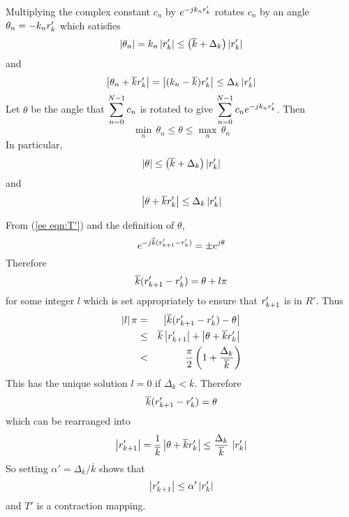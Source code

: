 Multiplying the complex constant $c_n$ by ${e^{-jk_n{r}'_k}}$ rotates $c_n$ by
an angle $\theta_n=-k_n{r}'_k$ which satisfies
\begin{equation}
\left|\theta_n\right|=
k_n\left|{r}'_k\right|\leq\left(\overline{k}+\Delta_k\right)\left|{r}'_k\right|
\end{equation}
and 
\begin{equation}
\left|\theta_n+\overline{k}{r}'_k\right|
=\left|(k_n-\overline{k}){r}'_k\right|\leq\Delta_k\left|{r}'_k\right|
\end{equation}
Let $\theta$ be the angle that $\displaystyle\sum_{n=0}^{N-1}c_n$ is rotated to give
$\displaystyle\sum_{n=0}^{N-1}c_n{e^{-jk_n{r}'_k}}$.  Then
\begin{equation}
\min_n\, \theta_n\leq \theta\leq\max_n\,\theta_n
\end{equation}
In particular,
\begin{equation}
\left|\theta\right|\leq\left(\overline{k}+\Delta_k\right)\left|{r}'_k\right|
\end{equation}
and 
\begin{equation}
\left|\theta+\overline{k}{r}'_k\right|\leq\Delta_k\left|{r}'_k\right|
\end{equation}

From (\ref{ee eqn:T'}) and the definition of $\theta$,
\begin{equation}
{e^{-j\overline{k}({r}'_{k+1}-{r}'_k)}}=\pm{e^{j\theta}}
\end{equation}
Therefore
\begin{equation}
\overline{k}({r}'_{k+1}-{r}'_k)=\theta+l\pi
\end{equation}
for some integer $l$ which is set appropriately to ensure that ${r}'_{k+1}$
is in $R'$.  Thus
\begin{eqnarray}
\left|l\right|\pi
&=&\left|\overline{k}({r}'_{k+1}-{r}'_k)-\theta\right| {\nonumber}\\
&\leq&\overline{k}\left|{r}'_{k+1}\right|+\left|\theta+\overline{k}{r}'_k\right|{\nonumber}\\
&<&\frac{\pi}{2}\left(1+\frac{\Delta_k}{\overline{k}}\right)
\end{eqnarray}
This has the unique solution $l=0$ if $\Delta_k<\overline{k}$.  Therefore
\begin{equation}
\overline{k}({r}'_{k+1}-{r}'_k)=\theta
\end{equation}
which can be rearranged into
\begin{equation}
\left|{r}'_{k+1}\right|=\frac{1}{\overline{k}}\left|\theta+\overline{k}{r}'_k
\right|\leq \frac{\Delta_k}{\overline{k}}\,\left|{r}'_k\right|
\end{equation}
So setting $\alpha'=\Delta_k/\overline{k}$ shows that
\begin{equation}
\left|{r}'_{k+1}\right|\leq \alpha'\left|{r}'_k\right|
\end{equation}
and $T'$ is a contraction mapping.

